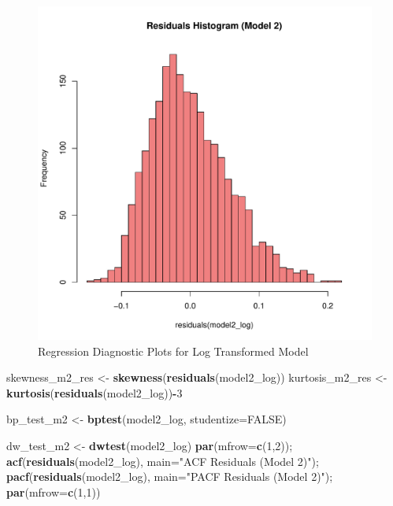 \documentclass[
]{article}
\newenvironment{Shaded}{\begin{snugshade}}{\end{snugshade}}
\newcommand{\AttributeTok}[1]{\textcolor[rgb]{0.13,0.29,0.53}{#1}}
\newcommand{\ConstantTok}[1]{\textcolor[rgb]{0.56,0.35,0.01}{#1}}
\newcommand{\DecValTok}[1]{\textcolor[rgb]{0.00,0.00,0.81}{#1}}
\newcommand{\FunctionTok}[1]{\textcolor[rgb]{0.13,0.29,0.53}{\textbf{#1}}}
\newcommand{\NormalTok}[1]{#1}
\newcommand{\OtherTok}[1]{\textcolor[rgb]{0.56,0.35,0.01}{#1}}
\newcommand{\SpecialCharTok}[1]{\textcolor[rgb]{0.81,0.36,0.00}{\textbf{#1}}}
\newcommand{\StringTok}[1]{\textcolor[rgb]{0.31,0.60,0.02}{#1}}
\begin{document}
\begin{figure}
\centering
\includegraphics{FinalProject_files/figure-latex/model2-diagnostics-3.pdf}
\caption{Regression Diagnostic Plots for Log Transformed Model}
\end{figure}

\begin{Shaded}
\begin{Highlighting}[]
\NormalTok{    skewness\_m2\_res }\OtherTok{\textless{}{-}} \FunctionTok{skewness}\NormalTok{(}\FunctionTok{residuals}\NormalTok{(model2\_log))}
\NormalTok{    kurtosis\_m2\_res }\OtherTok{\textless{}{-}} \FunctionTok{kurtosis}\NormalTok{(}\FunctionTok{residuals}\NormalTok{(model2\_log))}\SpecialCharTok{{-}}\DecValTok{3}
    
\NormalTok{    bp\_test\_m2 }\OtherTok{\textless{}{-}} \FunctionTok{bptest}\NormalTok{(model2\_log, }\AttributeTok{studentize=}\ConstantTok{FALSE}\NormalTok{)}
    
\NormalTok{    dw\_test\_m2 }\OtherTok{\textless{}{-}} \FunctionTok{dwtest}\NormalTok{(model2\_log)}
    \FunctionTok{par}\NormalTok{(}\AttributeTok{mfrow=}\FunctionTok{c}\NormalTok{(}\DecValTok{1}\NormalTok{,}\DecValTok{2}\NormalTok{)); }\FunctionTok{acf}\NormalTok{(}\FunctionTok{residuals}\NormalTok{(model2\_log), }\AttributeTok{main=}\StringTok{"ACF Residuals (Model 2)"}\NormalTok{); }\FunctionTok{pacf}\NormalTok{(}\FunctionTok{residuals}\NormalTok{(model2\_log), }\AttributeTok{main=}\StringTok{"PACF Residuals (Model 2)"}\NormalTok{); }\FunctionTok{par}\NormalTok{(}\AttributeTok{mfrow=}\FunctionTok{c}\NormalTok{(}\DecValTok{1}\NormalTok{,}\DecValTok{1}\NormalTok{))}
\end{Highlighting}
\end{Shaded}
\end{document}
